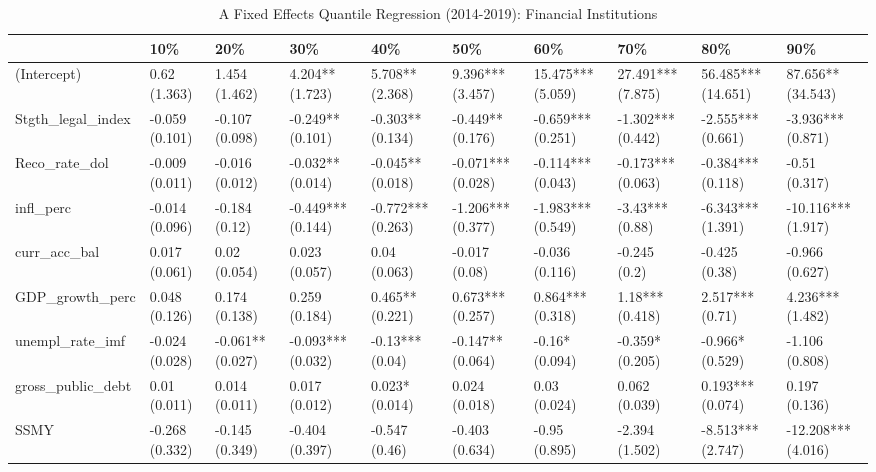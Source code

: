 \begin{table}[ht]
\centering
\caption{A Fixed Effects Quantile Regression (2014-2019): Financial Institutions} 
\begingroup\small
\begin{tabular}{llllllllll}
  \toprule
 & 10\% & 20\% & 30\% & 40\% & 50\% & 60\% & 70\% & 80\% & 90\% \\ 
  \midrule
(Intercept) & 0.62 (1.363) & 1.454 (1.462) & 4.204** (1.723) & 5.708** (2.368) & 9.396*** (3.457) & 15.475*** (5.059) & 27.491*** (7.875) & 56.485*** (14.651) & 87.656** (34.543) \\ 
  Stgth\_legal\_index & -0.059 (0.101) & -0.107 (0.098) & -0.249** (0.101) & -0.303** (0.134) & -0.449** (0.176) & -0.659*** (0.251) & -1.302*** (0.442) & -2.555*** (0.661) & -3.936*** (0.871) \\ 
  Reco\_rate\_dol & -0.009 (0.011) & -0.016 (0.012) & -0.032** (0.014) & -0.045** (0.018) & -0.071*** (0.028) & -0.114*** (0.043) & -0.173*** (0.063) & -0.384*** (0.118) & -0.51 (0.317) \\ 
  infl\_perc & -0.014 (0.096) & -0.184 (0.12) & -0.449*** (0.144) & -0.772*** (0.263) & -1.206*** (0.377) & -1.983*** (0.549) & -3.43*** (0.88) & -6.343*** (1.391) & -10.116*** (1.917) \\ 
  curr\_acc\_bal & 0.017 (0.061) & 0.02 (0.054) & 0.023 (0.057) & 0.04 (0.063) & -0.017 (0.08) & -0.036 (0.116) & -0.245 (0.2) & -0.425 (0.38) & -0.966 (0.627) \\ 
  GDP\_growth\_perc & 0.048 (0.126) & 0.174 (0.138) & 0.259 (0.184) & 0.465** (0.221) & 0.673*** (0.257) & 0.864*** (0.318) & 1.18*** (0.418) & 2.517*** (0.71) & 4.236*** (1.482) \\ 
  unempl\_rate\_imf & -0.024 (0.028) & -0.061** (0.027) & -0.093*** (0.032) & -0.13*** (0.04) & -0.147** (0.064) & -0.16* (0.094) & -0.359* (0.205) & -0.966* (0.529) & -1.106 (0.808) \\ 
  gross\_public\_debt & 0.01 (0.011) & 0.014 (0.011) & 0.017 (0.012) & 0.023* (0.014) & 0.024 (0.018) & 0.03 (0.024) & 0.062 (0.039) & 0.193*** (0.074) & 0.197 (0.136) \\ 
  SSMY & -0.268 (0.332) & -0.145 (0.349) & -0.404 (0.397) & -0.547 (0.46) & -0.403 (0.634) & -0.95 (0.895) & -2.394 (1.502) & -8.513*** (2.747) & -12.208*** (4.016) \\ 
   \bottomrule
\end{tabular}
\endgroup
\end{table}
